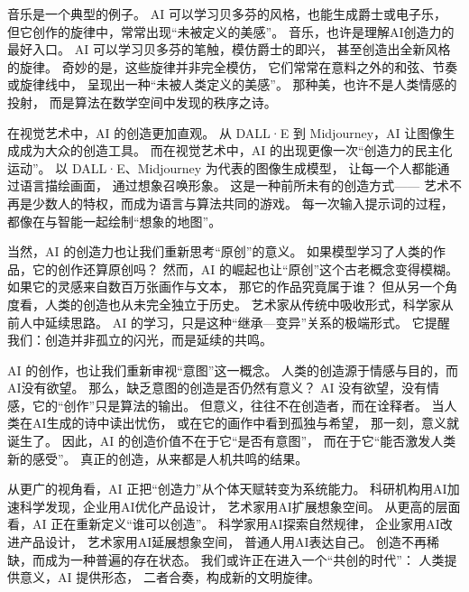 音乐是一个典型的例子。  
AI 可以学习贝多芬的风格，也能生成爵士或电子乐，  
但它创作的旋律中，常常出现“未被定义的美感”。  
音乐，也许是理解AI创造力的最好入口。  
AI 可以学习贝多芬的笔触，模仿爵士的即兴，  
甚至创造出全新风格的旋律。  
奇妙的是，这些旋律并非完全模仿，  
它们常常在意料之外的和弦、节奏或旋律线中，  
呈现出一种“未被人类定义的美感”。  
那种美，也许不是人类情感的投射，  
而是算法在数学空间中发现的秩序之诗。

在视觉艺术中，AI 的创造更加直观。  
从 DALL·E 到 Midjourney，AI 让图像生成成为大众的创造工具。  
而在视觉艺术中，AI 的出现更像一次“创造力的民主化运动”。  
以 DALL·E、Midjourney 为代表的图像生成模型，  
让每一个人都能通过语言描绘画面，  
通过想象召唤形象。  
这是一种前所未有的创造方式——  
艺术不再是少数人的特权，而成为语言与算法共同的游戏。  
每一次输入提示词的过程，  
都像在与智能一起绘制“想象的地图”。

当然，AI 的创造力也让我们重新思考“原创”的意义。  
如果模型学习了人类的作品，它的创作还算原创吗？  
然而，AI 的崛起也让“原创”这个古老概念变得模糊。  
如果它的灵感来自数百万张画作与文本，  
那它的作品究竟属于谁？  
但从另一个角度看，人类的创造也从未完全独立于历史。  
艺术家从传统中吸收形式，科学家从前人中延续思路。  
AI 的学习，只是这种“继承—变异”关系的极端形式。  
它提醒我们：创造并非孤立的闪光，而是延续的共鸣。

AI 的创作，也让我们重新审视“意图”这一概念。  
人类的创造源于情感与目的，而AI没有欲望。  
那么，缺乏意图的创造是否仍然有意义？  
AI 没有欲望，没有情感，它的“创作”只是算法的输出。  
但意义，往往不在创造者，而在诠释者。  
当人类在AI生成的诗中读出忧伤，  
或在它的画作中看到孤独与希望，  
那一刻，意义就诞生了。  
因此，AI 的创造价值不在于它“是否有意图”，  
而在于它“能否激发人类新的感受”。  
真正的创造，从来都是人机共鸣的结果。

从更广的视角看，AI 正把“创造力”从个体天赋转变为系统能力。  
科研机构用AI加速科学发现，企业用AI优化产品设计，  
艺术家用AI扩展想象空间。  
从更高的层面看，AI 正在重新定义“谁可以创造”。  
科学家用AI探索自然规律，  
企业家用AI改进产品设计，  
艺术家用AI延展想象空间，  
普通人用AI表达自己。  
创造不再稀缺，而成为一种普遍的存在状态。  
我们或许正在进入一个“共创的时代”：  
人类提供意义，AI 提供形态，  
二者合奏，构成新的文明旋律。

